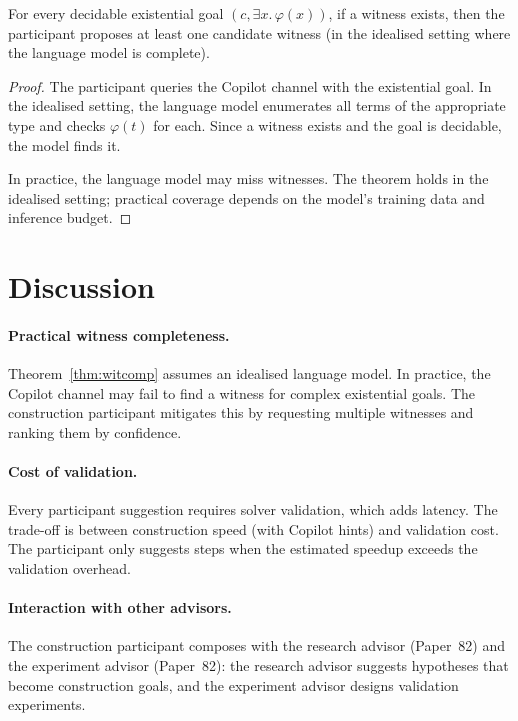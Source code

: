 \documentclass[11pt]{article}
\begin{document}
\begin{theorem}\label{thm:witcomp}
For every decidable existential goal $(c, \exists x.\,\varphi(x))$,
if a witness exists, then the participant proposes at least
one candidate witness (in the idealised setting where the
language model is complete).
\end{theorem}
\begin{proof}
The participant queries the Copilot channel with the
existential goal.  In the idealised setting, the language
model enumerates all terms of the appropriate type and
checks $\varphi(t)$ for each.  Since a witness exists and
the goal is decidable, the model finds it.

In practice, the language model may miss witnesses.  The
theorem holds in the idealised setting; practical coverage
depends on the model's training data and inference budget.
\end{proof}

\section{Discussion}\label{sec:discussion}

\paragraph{Practical witness completeness.}
Theorem~\ref{thm:witcomp} assumes an idealised language model.
In practice, the Copilot channel may fail to find a witness for
complex existential goals.  The construction participant mitigates
this by requesting multiple witnesses and ranking them by
confidence.

\paragraph{Cost of validation.}
Every participant suggestion requires solver validation, which
adds latency.  The trade-off is between construction speed
(with Copilot hints) and validation cost.  The participant
only suggests steps when the estimated speedup exceeds the
validation overhead.

\paragraph{Interaction with other advisors.}
The construction participant composes with the research advisor
(Paper~82) and the experiment advisor (Paper~82): the research
advisor suggests hypotheses that become construction goals, and
the experiment advisor designs validation experiments.
\end{document}

